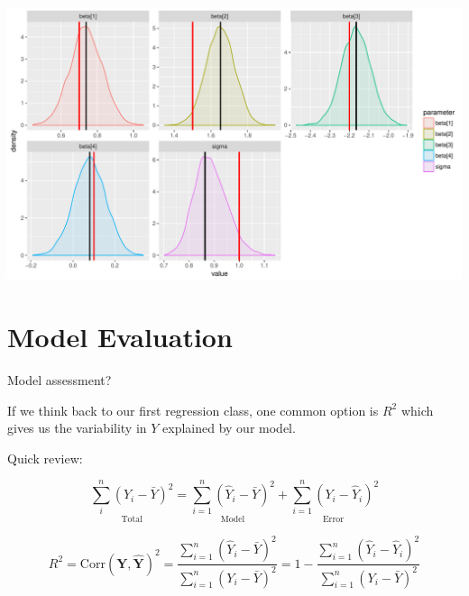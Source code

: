 \documentclass[11pt,ignorenonframetext,]{beamer}
\begin{document}
\begin{frame}{}

\includegraphics{Lec2_files/figure-beamer/unnamed-chunk-4-1.pdf}

\end{frame}

\section{Model Evaluation}\label{model-evaluation}

\begin{frame}{Model assessment?}

If we think back to our first regression class, one common option is
\(R^2\) which gives us the variability in \(Y\) explained by our model.

Quick review:

\pause

\[ \underset{\text{Total}}{\sum_{i}^n \left(Y_i - \bar{Y}\right)^2} = \underset{\text{Model}}{\sum_{i=1}^n \left(\hat{Y}_i - \bar{Y}\right)^2} + \underset{\text{Error }}{\sum_{i=1}^n \left(Y_i - \hat{Y}_i\right)^2} \]

\pause

\[ R^2 = \text{Corr}(\bm{Y}, \hat{\bm{Y}})^2 = \frac{\sum_{i=1}^n \left(\hat{Y}_i - \bar{Y}\right)^2}{\sum_{i=1}^n \left(Y_i - \bar{Y}\right)^2} = 1 - \frac{\sum_{i=1}^n \left(\hat{Y}_i - \hat{Y}_i\right)^2}{\sum_{i=1}^n \left(Y_i - \bar{Y}\right)^2}  \]

\end{frame}
\end{document}
